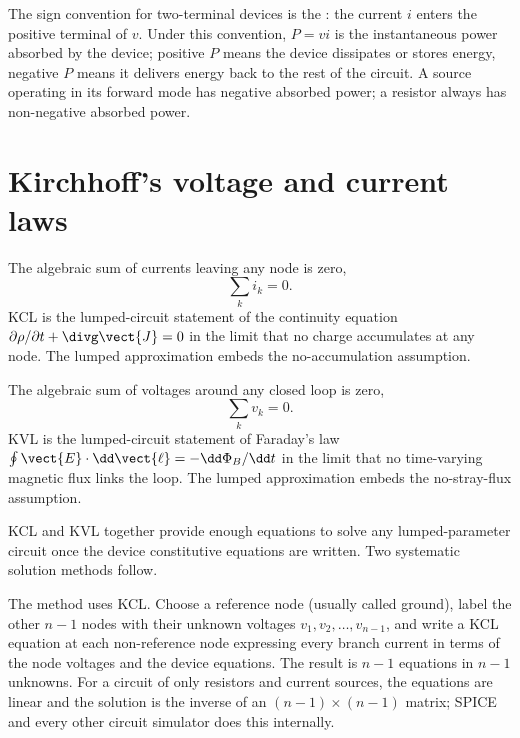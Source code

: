 The sign convention for two-terminal devices is the
: the current $i$ enters the
positive terminal of $v$. Under this convention, $P = vi$ is the
instantaneous power absorbed by the device; positive $P$ means the
device dissipates or stores energy, negative $P$ means it delivers
energy back to the rest of the circuit. A source operating in its
forward mode has negative absorbed power; a resistor always has
non-negative absorbed power.

\section{Kirchhoff's voltage and current laws}

\begin{principle}
The algebraic sum of currents leaving any node is zero,
\[
\sum_{k} i_{k} = 0.
\]
KCL is the lumped-circuit statement of the continuity equation
$\partial \rho/\partial t + \divg \vect{J} = 0$ in the limit that no
charge accumulates at any node. The lumped approximation embeds the
no-accumulation assumption.
\end{principle}

\begin{principle}
The algebraic sum of voltages around any closed loop is zero,
\[
\sum_{k} v_{k} = 0.
\]
KVL is the lumped-circuit statement of Faraday's law $\oint \vect{E}
\cdot \dd\vect{\ell} = -\dd \Phi_{B}/\dd t$ in the limit that no
time-varying magnetic flux links the loop. The lumped approximation
embeds the no-stray-flux assumption.
\end{principle}

KCL and KVL together provide enough equations to solve any
lumped-parameter circuit once the device constitutive equations are
written. Two systematic solution methods follow.

The  method uses KCL. Choose a reference node
(usually called ground), label the other $n-1$ nodes with their
unknown voltages $v_{1}, v_{2}, \ldots, v_{n-1}$, and write a KCL
equation at each non-reference node expressing every branch current
in terms of the node voltages and the device equations. The result is
$n-1$ equations in $n-1$ unknowns. For a circuit of only resistors
and current sources, the equations are linear and the solution is the
inverse of an $(n-1)\times(n-1)$ matrix; SPICE and every other circuit
simulator does this internally.

